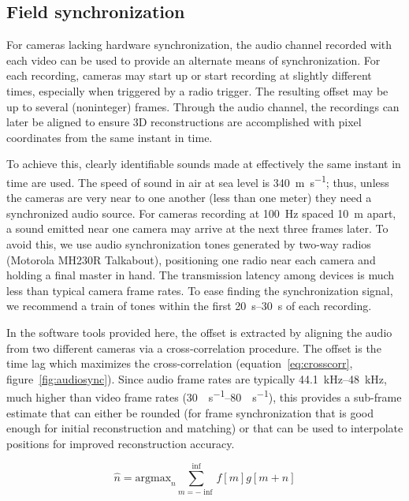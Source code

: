 \documentclass[fleqn,10pt]{wlpeerj}
\begin{document}
\subsection*{Field synchronization}
For cameras lacking hardware synchronization, the audio channel recorded with each video can be used to provide an alternate means of synchronization. For each recording, cameras may start up or start recording at slightly different times, especially when triggered by a radio trigger.  The resulting offset may be up to several (noninteger) frames.  Through the audio channel, the recordings can later be aligned to ensure 3D reconstructions are accomplished with pixel coordinates from the same instant in time. 

To achieve this, clearly identifiable sounds made at effectively the same instant in time are used.  The speed of sound in air at sea level is \SI{340}{\meter\per\second}; thus, unless the cameras are very near to one another (less than one meter) they need a synchronized audio source.  For cameras recording at \SI{100}{\hertz} spaced \SI{10}{\meter} apart, a sound emitted near one camera may arrive at the next three frames later. To avoid this, we use audio synchronization tones generated by two-way radios (Motorola MH230R Talkabout), positioning one radio near each camera and holding a final master in hand. The transmission latency among devices is much less than typical camera frame rates. To ease finding the synchronization signal, we recommend a train of tones within the first \SIrange{20}{30}{\second} of each recording.

In the software tools provided here, the offset is extracted by aligning the audio from two different cameras via a cross-correlation procedure.  The offset is the time lag which maximizes the cross-correlation (equation~\ref{eq:crosscorr}, figure~\ref{fig:audiosync}).  Since audio frame rates are typically \SIrange{44.1}{48}{\kilo\hertz}, much higher than video frame rates (\SIrange{30}{80}{\frame\per\second}), this provides a sub-frame estimate that can either be rounded (for frame synchronization that is good enough for initial reconstruction and matching) or that can be used to interpolate positions for improved reconstruction accuracy. 

\begin{equation}
\label{eq:crosscorr}
\hat{n} = \mbox{argmax}_n \sum_{m=-\inf}^{\inf} f[m] g[m+n]
\end{equation}
\end{document}

